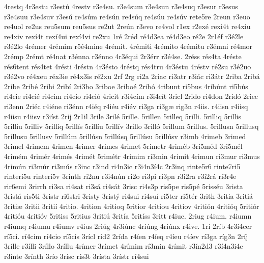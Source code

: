{4restq
4r3estu
r3est^^fa
4restv
r3e4su.
r3e4sum
r3e4sun
r3e4suq
r3esur
r3esus
r3e4suu
r3e4suv
r3es^^fa
re4s^^fam
re4s^^fan
re4s^^faq
re4s^^fau
re4s^^fav
rete5re
2reun
r3euo
re4uol
re2us
reu5sum
reu5sus
re2ut
2re^^fan
r3evo
re4vol
r1ex
r2ex^^e9
rexi4t
re4xiu
re4xiv
rex^^ed4t
rex^^ed4ui
rex^^ed4vi
re2xu
1r^^e9
2r^^e9d
r^^e94d3ea
r^^e94d3eo
r^^e92e
2r1^^e9f
r3^^e92le
r3^^e92lo
4r^^e9mer
4r^^e9mim
r5^^e94mine
4r^^e9mit.
4r^^e9miti
4r^^e9mito
4r^^e9mitu
r3^^e9mni
r^^e94mor
2r^^e9mp
2r^^e9mt
r^^e94nat
r3^^e9nna
r3^^e9nno
4r3^^e9qui
2r3^^e9rr
r3^^e94se.
2r^^e9ss
r^^e9s4ta
4r^^e9ste
r^^e9s6tent
r^^e9s4tet
4r^^e9sti
4r^^e9stn
4r3^^e9sto
4r^^e9stq
r^^e9s4tru
4r3^^e9stu
4r^^e9stv
r^^e92su
r3^^e92uo
r3^^e92vo
r^^e94xeu
r^^e9x3ie
r^^e94x3is
r^^e92xu
2rf
2rg
ri2a
2riac
ri3atr
r3i^^e1c
ri3^^e1tr
2riba
2rib^^e1
2ribe
2rib^^e9
2ribi
2rib^^ed
2ri3bo
3riboe
3ribo^^e9
2rib^^f3
4ribunt
ri5bus
4rib^^fant
ri5b^^fas
ri4cie
ri4ci^^e9
ri4cim
ri4cio
ri4ci^^f3
4ricit
r3i4c^^edm
r3i4c^^edt
3ricl
2rido
ri4don
2rid^^f3
2riec
ri3enn
2ri^^e9c
r4i^^e9ne
ri3^^e9nn
r4i^^e9q
r4i^^e9u
r4i^^e9v
ri3ga
ri3g^^e6
rig3n
r4iis.
r4iisn
r4iisq
r4iisu
r4iisv
r3i^^edst
2rij
2r1il
3rile
3ril^^e9
5rille.
5rillen
5rilleq
5rilli.
5rilliq
5rillis
5rilliu
5rilliv
5rill^^edq
5rill^^eds
5rill^^edu
5rill^^edv
3rillo
3rill^^f3
5rillum
5rillus.
5rillusn
5rillusq
5rillusu
5rillusv
5rill^^fam
5rill^^fasn
5rill^^fasq
5rill^^fasu
5rill^^fasv
r3imb
4rimeb
3rimed
3rimel
4rimem
4rimen
4rimer
4rimes
4rimet
5rimetr
4rim^^e9b
3ri5m^^e9d
3ri5m^^e9l
4rim^^e9m
4rim^^e9r
4rim^^e9s
4rim^^e9t
5rim^^e9tr
4rimim
ri3min
4rimit
4rimun
ri3mur
ri3mus
4rim^^fan
ri3m^^far
ri3m^^fas
r3inc
r3ind
ri4n3ic
r3i4n3^^ed4c
2r3inq
rinte5r6
rinte7ri5
rinter^^ed5u
rinter^^ed5v
3rinth
ri2nu
r3i4n^^fan
ri2o
ri3pi
ri3pn
r3i2ra
r3i2r^^e1
ri3r4e
rir6emi
3rirrh
ri3sa
ri4sat
ri3s^^e1
ri4s^^e1t
3risc
ri4s3p
ris5pe
ris5p^^e9
5riss^^e9u
3rista
3rist^^e1
ris5ti
3ristr
ri6stri
3risty
3rist^^fd
ri4sui
ri4su^^ed
ri5ter
ri5t^^e9r
3rith
3ritia
3riti^^e1
3riti^^e6
3ritii
3riti^^ed
4ritio.
4rition
4ritioq
5ritior
4ritiou
4ritiov
4riti^^f3n
4riti^^f3q
5riti^^f3r
4riti^^f3u
4riti^^f3v
5ritiss
5ritius
3riti^^fa
3rit^^eda
5rit^^edss
3ritt
r4iue.
2riug
r4ium.
r4iumn
r4iumq
r4iumu
r4iumv
r4ius
2ri^^fag
4r3i^^fanc
4ri^^fang
4ri^^fanx
r4ive.
1r^^ed
2r^^edb
4r3^^ed4cer
r^^ed5ci.
r^^ed4cim
r^^ed4cio
r^^ed5cis
3r^^edcl
r^^edd2
2r^^edda
r4^^eden
r4^^edeq
r4^^edeu
r4^^edev
r^^ed3ga
r^^edg3n
2r^^edj
3r^^edlle
r3^^edlli
3r^^edllo
3r^^edllu
4r^^edmer
3r^^edmet
4r^^edmim
r^^ed3min
4r^^edmit
r3^^edn2d3
r3^^ed4n3i4c
r3^^ednte
3r^^ednth
3r^^edo
3r^^edsc
r^^eds3t
3r^^edsta
3r^^edstr
r^^ed4sui
}
